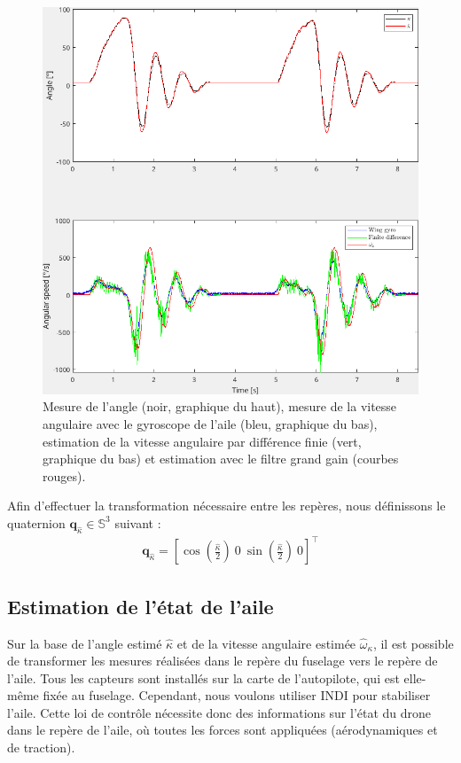 \begin{figure}[ht!]
\centering
    \includegraphics[width=0.8\columnwidth,angle=0]{figures/highGainFilter.png}
    \caption{Mesure de l'angle (noir, graphique du haut), mesure de la vitesse angulaire avec le gyroscope de l'aile (bleu, graphique du bas), estimation de la vitesse angulaire par différence finie (vert, graphique du bas) et estimation avec le filtre grand gain (courbes rouges).}
    \label{fig:high_gain}
\end{figure}

Afin d'effectuer la transformation nécessaire entre les repères, nous définissons le quaternion $\boldsymbol{q}_{\hat{\kappa}} \in {\mathbb S}^3$ suivant :
\begin{align}
\label{eq:rot_quat}
\boldsymbol{q}_{\hat{\kappa}} =  \left[\cos\left(\frac{\hat{\kappa}}{2}\right) ~ 0 ~ \sin\left(\frac{\hat{\kappa}}{2}\right) ~ 0 \right]^\top
\end{align}


\subsection{Estimation de l'état de l'aile}

Sur la base de l'angle estimé $\hat{\kappa}$ et de la vitesse angulaire estimée $\hat{\omega}_{\kappa}$, il est possible de transformer les mesures réalisées dans le repère du fuselage vers le repère de l'aile. Tous les capteurs sont installés sur la carte de l'autopilote, qui est elle-même fixée au fuselage. Cependant, nous voulons utiliser INDI pour stabiliser l'aile. Cette loi de contrôle nécessite donc des informations sur l'état du drone dans le repère de l'aile, où toutes les forces sont appliquées (aérodynamiques et de traction).


